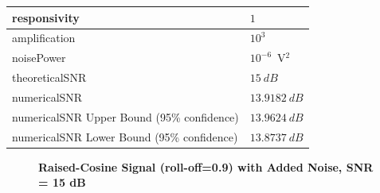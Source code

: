 \begin{refsection}
\begin{table}[H]
\begin{tabular}{|l|l|}
		responsivity           & $1$                                                        \\ \hline
		amplification          & $10^3$                                                     \\ \hline
		noisePower   & $10^{-6}$~V$^2$                             					\\ \hline
		theoreticalSNR  	   & $15~dB$                             					\\ \hline
		numericalSNR 		   & $13.9182~dB$                             					\\ \hline
		numericalSNR Upper Bound (95\% confidence) & $13.9624~dB$                             					\\ \hline
		numericalSNR Lower Bound (95\% confidence) & $13.8737~dB$                             					\\ \hline
	\end{tabular}
\end{table}
\begin{figure}[H]
		\centering
	\textbf{Raised-Cosine Signal (roll-off=0.9) with Added Noise, SNR = 15 dB}
	\begin{minipage}{\linewidth}
		\centering
	\begin{subfigure}{.45\textwidth}
		\centering

\end{subfigure}
\end{minipage}
\end{figure}
\end{refsection}
